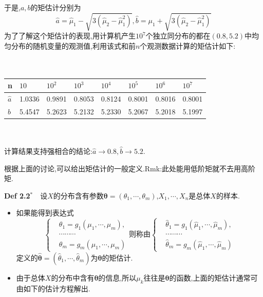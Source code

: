 	\begin{frame}
		于是,$a,b$的矩估计分别为
		\begin{equation}
		\widehat{a} = \widehat{\mu}_1 -\sqrt{3(\widehat{\mu}_2 - \widehat{\mu}_1^2)},\widehat{b} = \mu_1 +\sqrt{3(\widehat{\mu}_2 - \widehat{\mu}_1^2)}
		\end{equation}
		为了了解这个矩估计的表现,用计算机产生$10^7$个独立同分布的都在$(0.8,5.2)$中均匀分布的随机变量的观测值,利用该式和前$n$个观测数据计算的矩估计如下:
		\\ \hspace*{\fill} \\%
		$\quad$\begin{tabular}{|l|l|l|l|l|l|l|l|}
			\hline n & $10$ & $10^2$ & $10^3$ & $10^4$ & $10^5$ & $10^6$ & $10^7$ \\
			\hline $\widehat{a}$ & 1.0336 & 0.9891 & 0.8053 & 0.8124 & 0.8001 & 0.8016 & 0.8001\\
			\hline $\widehat{b}$ & 5.4547 & 5.2623 & 5.2132 & 5.2330 & 5.2067 & 5.2018 & 5.1997\\
			\hline
		\end{tabular}
		\\ \hspace*{\fill} \\%
		计算结果支持强相合的结论:$\widehat{a}\to 0.8,\widehat{b}\to 5.2$.
	\end{frame}

	\begin{frame}
		根据上面的讨论,可以给出矩估计的一般定义.Rmk:此处能用低阶矩就不去用高阶矩.
		\begin{block}{\textbf{Def 2.2$^*$}$\quad$设$X$的分布含有参数$\bm{\theta} = (\theta_1,\cdots,\theta_m)$,$X_1,\cdots,X_n$是总体$X$的样本.}
			\begin{itemize}
				\item 如果能得到表达式\begin{equation}  
				\left\{
				\begin{aligned}
				&\theta_1 = g_1(\mu_1,\cdots,\mu_m), \\
				&\cdots\cdots\cdots\\
				&\theta_m = g_m(\mu_1,\cdots,\mu_m)
				\end{aligned}
				\right.\text{则称由}
				\left\{
				\begin{aligned}
				&\widehat{\theta}_1 = g_1(\widehat{\mu}_1,\cdots,\widehat{\mu}_m), \\
				&\cdots\cdots\cdots\\
				&\widehat{\theta}_m = g_m(\widehat{\mu}_1,\cdots,\widehat{\mu}_m)
				\end{aligned}
				\right.
				\end{equation}
				定义的$\widehat{\bm{\theta}} = (\widehat{\theta}_1,\cdots,\widehat{\theta}_m)$为$\bm{\theta}$的矩估计.
				\item 由于总体$X$的分布中含有$\bm{\theta}$的信息,所以$\mu_k$往往是$\bm{\theta}$的函数,上面的矩估计通常可由如下的估计方程解出.
			\end{itemize}
		\end{block}
		
	\end{frame}

